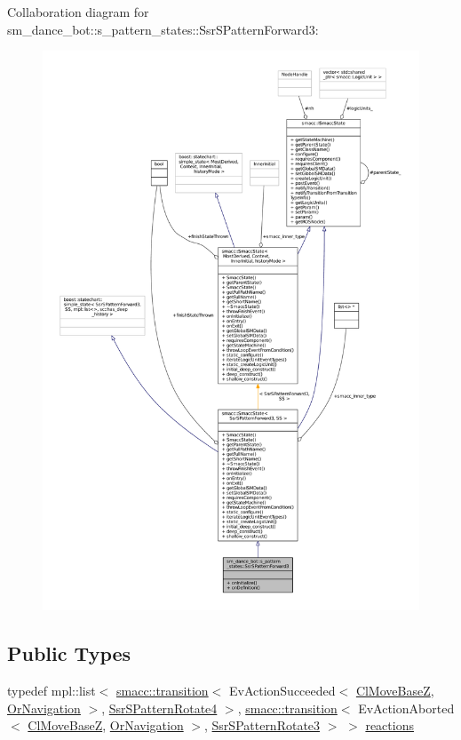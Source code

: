 Collaboration diagram for sm\+\_\+dance\+\_\+bot\+:\+:s\+\_\+pattern\+\_\+states\+:\+:Ssr\+S\+Pattern\+Forward3\+:
\nopagebreak
\begin{figure}[H]
\begin{center}
\leavevmode
\includegraphics[width=350pt]{structsm__dance__bot_1_1s__pattern__states_1_1SsrSPatternForward3__coll__graph}
\end{center}
\end{figure}
\subsection*{Public Types}
\begin{DoxyCompactItemize}
\item 
typedef mpl\+::list$<$ \hyperlink{classsmacc_1_1transition}{smacc\+::transition}$<$ Ev\+Action\+Succeeded$<$ \hyperlink{classmove__base__z__client_1_1ClMoveBaseZ}{Cl\+Move\+BaseZ}, \hyperlink{classsm__dance__bot_1_1OrNavigation}{Or\+Navigation} $>$, \hyperlink{structsm__dance__bot_1_1s__pattern__states_1_1SsrSPatternRotate4}{Ssr\+S\+Pattern\+Rotate4} $>$, \hyperlink{classsmacc_1_1transition}{smacc\+::transition}$<$ Ev\+Action\+Aborted$<$ \hyperlink{classmove__base__z__client_1_1ClMoveBaseZ}{Cl\+Move\+BaseZ}, \hyperlink{classsm__dance__bot_1_1OrNavigation}{Or\+Navigation} $>$, \hyperlink{structsm__dance__bot_1_1s__pattern__states_1_1SsrSPatternRotate3}{Ssr\+S\+Pattern\+Rotate3} $>$ $>$ \hyperlink{structsm__dance__bot_1_1s__pattern__states_1_1SsrSPatternForward3_a2848ec67b45a8448e56aa6d2b0817c75}{reactions}
\end{DoxyCompactItemize}
